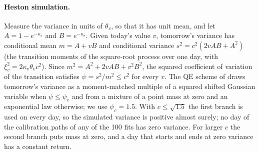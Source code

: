 \begin{table}[tbp]
  \centering
  \caption{Fits of the univariate generators on \TRAIN{}, full version (E3, 100 tickers, one fit
    per ticker and generator).}
  \label{tab:e3-fit-diagnostics-full}
  \small
\end{table}

\paragraph{Heston simulation.}
Measure the variance in units of $\theta_v$, so that it has unit mean, and let $A=1-e^{-\kappa_v}$
and $B=e^{-\kappa_v}$. Given today's value $v$, tomorrow's variance has conditional mean
$m=A+vB$ and conditional variance $s^2=c^2(2vAB+A^2)$ (the transition moments of the square-root
process over one day, with $\xi_v^2=2\kappa_v\theta_vc^2$). Since $m^2=A^2+2vAB+v^2B^2$, the
squared coefficient of variation of the transition satisfies $\psi=s^2/m^2\le c^2$ for every $v$.
The QE scheme of \citet{andersen_2008_simple} draws tomorrow's variance as a moment-matched
multiple of a squared shifted Gaussian variable when $\psi\le\psi_c$ and from a mixture of a point
mass at zero and an exponential law otherwise; we use $\psi_c=1.5$. With $c\le\sqrt{1.5}$ the
first branch is used on every day, so the simulated variance is positive almost surely; no day
of the calibration paths of any of the 100 fits has zero variance. For larger $c$ the second
branch puts mass at zero, and a day that starts and ends at zero variance has a constant return.

